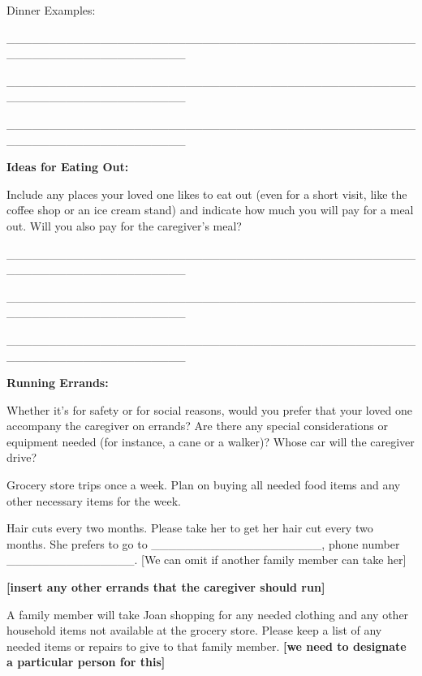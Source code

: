 \documentclass[]{article}
\begin{document}
Dinner Examples:

\_\_\_\_\_\_\_\_\_\_\_\_\_\_\_\_\_\_\_\_\_\_\_\_\_\_\_\_\_\_\_\_\_\_\_\_\_\_\_\_\_\_\_\_\_\_\_\_\_\_\_\_\_\_\_\_\_\_\_\_\_\_\_\_\_\_\_\_\_

\_\_\_\_\_\_\_\_\_\_\_\_\_\_\_\_\_\_\_\_\_\_\_\_\_\_\_\_\_\_\_\_\_\_\_\_\_\_\_\_\_\_\_\_\_\_\_\_\_\_\_\_\_\_\_\_\_\_\_\_\_\_\_\_\_\_\_\_\_

\_\_\_\_\_\_\_\_\_\_\_\_\_\_\_\_\_\_\_\_\_\_\_\_\_\_\_\_\_\_\_\_\_\_\_\_\_\_\_\_\_\_\_\_\_\_\_\_\_\_\_\_\_\_\_\_\_\_\_\_\_\_\_\_\_\_\_\_\_

\textbf{Ideas for Eating Out:}

Include any places your loved one likes to eat out (even for a short
visit, like the coffee shop or an ice cream stand) and indicate how much
you will pay for a meal out. Will you also pay for the caregiver's meal?

\_\_\_\_\_\_\_\_\_\_\_\_\_\_\_\_\_\_\_\_\_\_\_\_\_\_\_\_\_\_\_\_\_\_\_\_\_\_\_\_\_\_\_\_\_\_\_\_\_\_\_\_\_\_\_\_\_\_\_\_\_\_\_\_\_\_\_\_\_

\_\_\_\_\_\_\_\_\_\_\_\_\_\_\_\_\_\_\_\_\_\_\_\_\_\_\_\_\_\_\_\_\_\_\_\_\_\_\_\_\_\_\_\_\_\_\_\_\_\_\_\_\_\_\_\_\_\_\_\_\_\_\_\_\_\_\_\_\_

\_\_\_\_\_\_\_\_\_\_\_\_\_\_\_\_\_\_\_\_\_\_\_\_\_\_\_\_\_\_\_\_\_\_\_\_\_\_\_\_\_\_\_\_\_\_\_\_\_\_\_\_\_\_\_\_\_\_\_\_\_\_\_\_\_\_\_\_\_

\textbf{Running Errands:}

Whether it's for safety or for social reasons, would you prefer that
your loved one accompany the caregiver on errands? Are there any special
considerations or equipment needed (for instance, a cane or a walker)?
Whose car will the caregiver drive?

Grocery store trips once a week. Plan on buying all needed food items
and any other necessary items for the week.

Hair cuts every two months. Please take her to get her hair cut every
two months. She prefers to go to
\_\_\_\_\_\_\_\_\_\_\_\_\_\_\_\_\_\_\_\_, phone number
\_\_\_\_\_\_\_\_\_\_\_\_\_\_\_. {[}We can omit if another family member
can take her{]}

\textbf{{[}insert any other errands that the caregiver should run{]}}

A family member will take Joan shopping for any needed clothing and any
other household items not available at the grocery store. Please keep a
list of any needed items or repairs to give to that family member.
\textbf{{[}we need to designate a particular person for this{]}}
\end{document}
